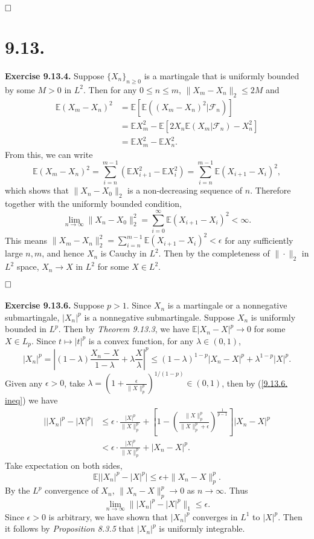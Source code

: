 \documentclass[12pt]{extarticle}
\begin{document}
$\hspace{\fill}\square$


\newpage
\section*{9.13.}
\textbf{Exercise 9.13.4.}
Suppose $\{X_n\}_{n\geq 0}$ is a martingale that is uniformly bounded by some $M>0$ in $L^2$. Then for any $0\leq n\leq m$, $\|X_m-X_n\|_2\leq 2M$ and
\[
\begin{aligned}
\mathbb{E}(X_m-X_n)^2
&=
\mathbb{E}\left[\mathbb{E}\left((X_m-X_n)^2|\mathcal{F}_n\right)\right]
\\&=
\mathbb{E}X_m^2-\mathbb{E}\left[2X_n\mathbb{E}(X_m|\mathcal{F}_n)-X_n^2\right]
\\&=
\mathbb{E}X_m^2-\mathbb{E}X_n^2.
\end{aligned}
\]
From this, we can write
\[
\mathbb{E}(X_m-X_n)^2=\sum_{i=n}^{m-1}\left(\mathbb{E}X_{i+1}^2-\mathbb{E}X_i^2\right)=\sum_{i=n}^{m-1}\mathbb{E}(X_{i+1}-X_i)^2,
\]
which shows that $\|X_n-X_0\|_2$ is a non-decreasing sequence of $n$. Therefore together with the uniformly bounded condition, 
\[
\lim_{n\rightarrow\infty}\|X_n-X_0\|_2^2=\sum_{i=0}^\infty\mathbb{E}(X_{i+1}-X_i)^2<\infty.
\]
This means $\|X_m-X_n\|_2^2=\sum_{i=n}^{m-1}\mathbb{E}(X_{i+1}-X_i)^2<\epsilon$ for any sufficiently large $n,m$, and hence $X_n$ is Cauchy in $L^2$. Then by the completeness of $\|\cdot\|_2$ in $L^2$ space, $X_n\rightarrow X$ in $L^2$ for some $X\in L^2$.

$\hspace{\fill}\square$
\\
\\
\textbf{Exercise 9.13.6.}
Suppose $p>1$. Since $X_n$ is a martingale or a nonnegative submartingale, $|X_n|^p$ is a nonnegative submartingale. Suppose $X_n$ is uniformly bounded in $L^p$. Then by \textit{Theorem 9.13.3}, we have $\mathbb{E}|X_n-X|^p\rightarrow 0$ for some $X\in L_p$. Since $t\mapsto|t|^p$ is a convex function, for any $\lambda\in(0,1)$,
\begin{equation}
|X_n|^p=\left|(1-\lambda)\frac{X_n-X}{1-\lambda}+\lambda\frac{X}{\lambda}\right|^p\leq(1-\lambda)^{1-p}|X_n-X|^p+\lambda^{1-p}|X|^p.
\label{9.13.6. ineq}
\end{equation}
Given any $\epsilon>0$, take $\lambda=\left(1+\frac{\epsilon}{\|X\|_p^p}\right)^{1/(1-p)}\in(0,1)$, then by (\ref{9.13.6. ineq}) we have
\[
\begin{aligned}
\big||X_n|^p-|X|^p\big|
&\leq
\epsilon\cdot\frac{|X|^p}{\|X\|_p^p}+\left[1-\left(\frac{{\|X\|_p^p}}{{\|X\|_p^p}+\epsilon}\right)^{\frac{1}{p-1}}\right]|X_n-X|^p
\\&<
\epsilon\cdot\frac{|X|^p}{\|X\|_p^p}+|X_n-X|^p.
\end{aligned}
\]
Take expectation on both sides,
\[
\mathbb{E}\big||X_n|^p-|X|^p\big|
\leq\epsilon+\|X_n-X\|_p^p.
\]
By the $L^p$ convergence of $X_n$, $\|X_n-X\|_p^p\rightarrow 0$ as $n\rightarrow\infty$. Thus
\[
\lim_{n\rightarrow\infty}\||X_n|^p-|X|^p\|_1\leq\epsilon.
\]
Since $\epsilon>0$ is arbitrary, we have shown that $|X_n|^p$ converges in $L^1$ to $|X|^p$. Then it follows by \textit{Proposition 8.3.5} that $|X_n|^p$ is uniformly integrable.
\end{document}
